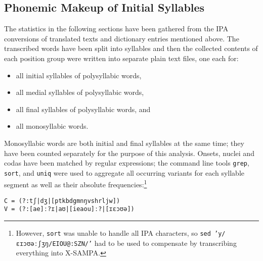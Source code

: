\subsection{Phonemic Makeup of Initial Syllables}

The statistics in the following sections have been gathered from the IPA 
conversions of translated texts and dictionary entries mentioned above. The 
transcribed words have been split into syllables and then the collected contents 
of each position group were written into separate plain text files, one each for:

\begin{itemize}
	\item all initial syllables of polysyllabic words,
	\item all medial syllables of polysyllabic words,
	\item all final syllables of polysyllabic words, and 
	\item all monosyllabic words.
\end{itemize}

Monosyllabic words are both initial and final syllables at the same time; they 
have been counted separately for the purpose of this analysis. Onsets, nuclei 
and codas have been matched by regular expressions; the com\-mand line tools 
\texttt{grep}, \texttt{sort}, and \texttt{uniq} were used to aggregate all 
occurring variants for each syllable segment as well as their absolute 
frequencies:\footnote{However, \texttt{sort} was unable to handle all IPA 
characters, so \texttt{sed 'y/ɛɪɔʊəːʃʒŋ/EIOU@:SZN/'} had to be used to 
compensate by transcribing everything into X-SAMPA.}

\ex
	\texttt{C = (?:tʃ|dʒ|[ptkbdgmnŋvshrljw])\\
	V = (?:[ae]ː?ɪ|aʊ|[ieaou]ː?|[ɪɛɔʊə])}
\xe

